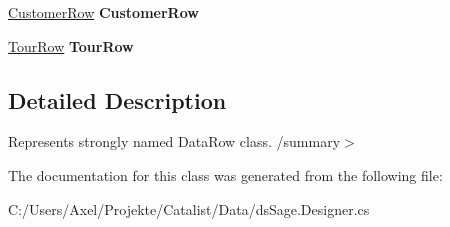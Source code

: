 \begin{DoxyCompactItemize}
\item 
\hyperlink{class_products_1_1_data_1_1ds_sage_1_1_customer_row}{Customer\+Row} {\bfseries Customer\+Row}\hypertarget{class_products_1_1_data_1_1ds_sage_1_1_tour_kunde_xref_row_a15f4862fd4a50b34240b9640ee431ef0}{}\label{class_products_1_1_data_1_1ds_sage_1_1_tour_kunde_xref_row_a15f4862fd4a50b34240b9640ee431ef0}

\item 
\hyperlink{class_products_1_1_data_1_1ds_sage_1_1_tour_row}{Tour\+Row} {\bfseries Tour\+Row}\hypertarget{class_products_1_1_data_1_1ds_sage_1_1_tour_kunde_xref_row_ac5b050bdb8cf471dd3045b2b04b5bfaa}{}\label{class_products_1_1_data_1_1ds_sage_1_1_tour_kunde_xref_row_ac5b050bdb8cf471dd3045b2b04b5bfaa}

\end{DoxyCompactItemize}


\subsection{Detailed Description}
Represents strongly named Data\+Row class. /summary$>$ 

The documentation for this class was generated from the following file\+:\begin{DoxyCompactItemize}
\item 
C\+:/\+Users/\+Axel/\+Projekte/\+Catalist/\+Data/ds\+Sage.\+Designer.\+cs\end{DoxyCompactItemize}
